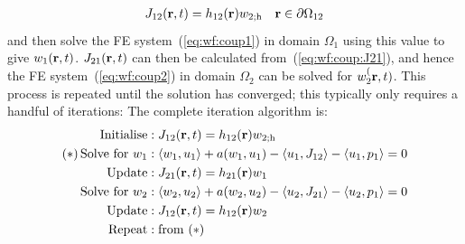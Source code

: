 \documentclass[a4paper]{article}
\numberwithin{equation}{section}
\begin{document}
\begin{align}
\begin{matrix}
J_{12}(\boldsymbol{\mathrm{r}},t) = h_{12}(\boldsymbol{\mathrm{r}}) w_{2;\mathrm{h}} &\boldsymbol{\mathrm{r}}\in\partial\Omega_{12}
\end{matrix}
\end{align}
and then solve the FE system~(\ref{eq:wf:coup1}) in domain $\Omega_1$ using
this value to give $w_1(\boldsymbol{\mathrm{r}},t)$. $J_{21}(\boldsymbol{\mathrm{r}},t)$ can then be calculated from~(\ref{eq:wf:coup:J21}),
and hence the FE system~(\ref{eq:wf:coup2}) in domain $\Omega_2$ 
can be  solved for $w_2^(\boldsymbol{\mathrm{r}},t)$. This process is repeated until the solution has converged; this typically only 
requires a handful of iterations: The complete iteration algorithm is:
\begin{align}
\mathrm{Initialise} &: J_{12}(\boldsymbol{\mathrm{r}},t) = h_{12}(\boldsymbol{\mathrm{r}}) w_{2;\mathrm{h}} \nonumber \\
\mathrm{(\ast)\,Solve\,\,for}\,\,w_1 &: \langle w_1,u_1 \rangle + a(w_1,u_1) - \langle u_1 , J_{12} \rangle - \langle u_1 , p_1 \rangle = 0 \nonumber \\
\mathrm{Update} &: J_{21}(\boldsymbol{\mathrm{r}},t) = h_{21}(\boldsymbol{\mathrm{r}}) w_1 \nonumber \\
\mathrm{Solve\,\,for}\,\,w_2 &: \langle w_2,u_2 \rangle + a(w_2,u_2) - \langle u_2 , J_{21} \rangle - \langle u_2 , p_1 \rangle = 0 \nonumber \\
\mathrm{Update} &: J_{12}(\boldsymbol{\mathrm{r}},t) = h_{12}(\boldsymbol{\mathrm{r}}) w_2 \nonumber \\
\mathrm{Repeat} &: \mathrm{from}\,\,(\ast) \nonumber
\end{align}
\end{document}
